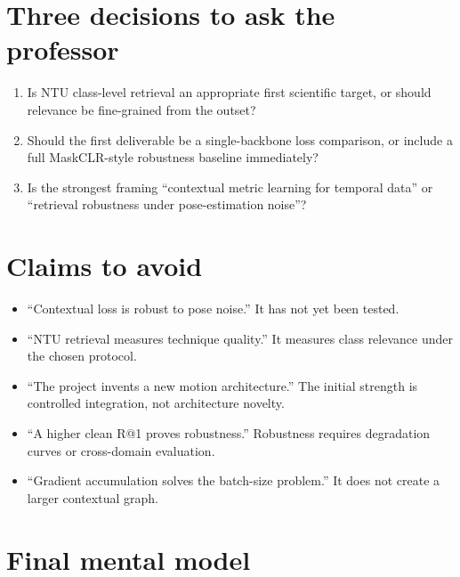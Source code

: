 \documentclass[11pt,oneside,openany]{book}
\theoremstyle{myplain}
\theoremstyle{definition}
\begin{document}
\section{Three decisions to ask the professor}

\begin{enumerate}[leftmargin=*,itemsep=5pt]
  \item Is NTU class-level retrieval an appropriate first scientific target, or should relevance be fine-grained from the outset?
  \item Should the first deliverable be a single-backbone loss comparison, or include a full MaskCLR-style robustness baseline immediately?
  \item Is the strongest framing ``contextual metric learning for temporal data'' or ``retrieval robustness under pose-estimation noise''?
\end{enumerate}

\section{Claims to avoid}

\begin{warningbox}[title=Do not say these]
\begin{itemize}[leftmargin=*,itemsep=2pt]
  \item ``Contextual loss is robust to pose noise.'' It has not yet been tested.
  \item ``NTU retrieval measures technique quality.'' It measures class relevance under the chosen protocol.
  \item ``The project invents a new motion architecture.'' The initial strength is controlled integration, not architecture novelty.
  \item ``A higher clean R@1 proves robustness.'' Robustness requires degradation curves or cross-domain evaluation.
  \item ``Gradient accumulation solves the batch-size problem.'' It does not create a larger contextual graph.
\end{itemize}
\end{warningbox}

\section{Final mental model}
\end{document}
